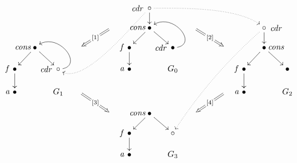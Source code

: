 \documentclass{eptcs}
\theoremstyle{plain}
\theoremstyle{definition}
\begin{document}
$$\SelectTips {cm}{}
\xymatrix@=3ex{
&    &    &    &    &    &    &   \save []-<.5cm, .0cm>*\txt{\emph{cdr}} \restore  \circ \ar[d] { \ar@(dl,dr)@{..>}[dddlllll]  \ar@(r,ul)@{..>}[drrrrrr]}
                                        &    &    &    &    &    &    &    \\
    &    &    &    &    & \mbox{}\ar@{=>}[dll]|{\ [1]\ }
                             &    &\save []-<.5cm, .0cm>*\txt{\emph{cons}} \restore \bullet \ar[dl] \ar[dr]
                                       &    &  \mbox{}\ar@{=>}[drr]|{\ [2]\ }   
                                                 &    &    &    &  \save []+<.5cm, .0cm>*\txt{\emph{cdr}} \restore \circ \ar[d]  \ar@/_/@{..>}[dddddlllll]&    \\
    & \save []-<.5cm, .0cm>*\txt{\emph{cons}} \restore \bullet \ar[dl] \ar[dr]
         &    &\mbox{}&    &    &\save []-<.3cm, .0cm>*\txt{\emph{f}} \restore \bullet \ar[d]
                                  &    & \save []-<.5cm, .0cm>*\txt{\emph{cdr}} \restore \bullet \ar@(r,ur)[ul]
                                            &    &    &    &    &  \save []+<.5cm, .0cm>*\txt{\emph{cons}} \restore \bullet \ar[dl] \ar[dr]
                                                                     &     \\
\save []-<.3cm, .0cm>*\txt{\emph{f}} \restore \bullet \ar[d]    
    &    & \save []-<.5cm, .0cm>*\txt{\emph{cdr}} \restore \circ  \ar@(r,ur)[ul]
              &    &    &    & \save []-<.3cm, .0cm>*{\txt{\emph{a}}} \restore \bullet
                                  &    &   G_0 &    &    &    &  \save []-<.3cm, .0cm>*\txt{\emph{f}} \restore \bullet \ar[d] 
                                                                &    &  \bullet 
                                                                          \\
\save []-<.3cm, .0cm>*\txt{\emph{a}} \restore \bullet
    &    & G_1  &  \mbox{} \ar@{=>}[drr]|{\ [3]\ }
                   &    &    &    &    &    &    &    & \mbox{} \ar@{=>}[dll]|{\ [4]\ }
                                                           &  \save []-<.3cm, .0cm>*\txt{\emph{a}} \restore \bullet
                                                                &      & G_2 \\
&    &    &    &    & \mbox{}
                             &    &  \save []-<.5cm, .0cm>*\txt{\emph{cons}} \restore \bullet \ar[dl] \ar[dr]
                                       &    & \mbox{}
                                                 &    &    &    &    &     \\
    &    &    &    &    &    &\save []-<.3cm, .0cm>*\txt{\emph{f}} \restore \bullet \ar[d]
                                  &    & {\circ} &    &    &    &    &    &   \\
    &    &    &    &    &    & \save []-<.3cm, .0cm>*\txt{\emph{a}} \restore \bullet   &    &  G_3   &    &    &    &    &    &    
}
$$
\end{document}
